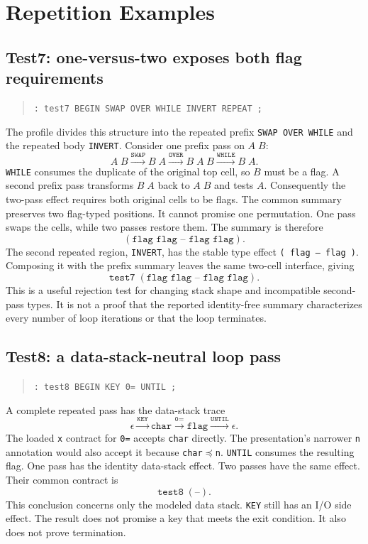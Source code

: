 \documentclass[11pt,a4paper]{article}
\newcommand{\effect}[1]{\mbox{\texttt{#1}}}
\begin{document}
\section{Repetition Examples}
\label{sec:loop-examples}

\subsection{Test7: one-versus-two exposes both flag requirements}

\begin{quote}
\texttt{: test7  BEGIN SWAP OVER WHILE INVERT REPEAT ;}
\end{quote}
The profile divides this structure into the repeated prefix
\texttt{SWAP OVER WHILE} and the repeated body \texttt{INVERT}.  Consider one
prefix pass on $A\;B$:
\[
 A\;B
 \xrightarrow{\texttt{SWAP}} B\;A
 \xrightarrow{\texttt{OVER}} B\;A\;B
 \xrightarrow{\texttt{WHILE}} B\;A.
\]
\texttt{WHILE} consumes the duplicate of the original top cell, so $B$ must be
a flag.  A second prefix pass transforms $B\;A$ back to $A\;B$ and tests $A$.
Consequently the two-pass effect requires both original cells to be flags.
The common summary preserves two flag-typed positions.  It cannot promise one
permutation.  One pass swaps the cells, while two passes restore them.  The
summary is therefore
\[
                        (\texttt{flag flag -- flag flag}).
\]
The second repeated region, \texttt{INVERT}, has the stable type effect
\effect{( flag -- flag )}.  Composing it with the prefix summary leaves the
same two-cell interface, giving
\[
          \texttt{test7}\;(\texttt{flag flag -- flag flag}).
\]
This is a useful rejection test for changing stack shape and incompatible
second-pass types.  It is not a proof that the reported identity-free summary
characterizes every number of loop iterations or that the loop terminates.

\subsection{Test8: a data-stack-neutral loop pass}

\begin{quote}
\texttt{: test8  BEGIN KEY 0= UNTIL ;}
\end{quote}
A complete repeated pass has the data-stack trace
\[
 \epsilon
 \xrightarrow{\texttt{KEY}} \texttt{char}
 \xrightarrow{\texttt{0=}} \texttt{flag}
 \xrightarrow{\texttt{UNTIL}} \epsilon.
\]
The loaded \texttt{x} contract for \texttt{0=} accepts \texttt{char}
directly.  The presentation's narrower \texttt{n} annotation would also accept
it because \texttt{char}$\preceq$\texttt{n}.  \texttt{UNTIL} consumes the
resulting flag.  One pass has the
identity data-stack effect.  Two passes have the same effect.  Their common
contract is
\[
                         \texttt{test8}\;(\texttt{--}).
\]
This conclusion concerns only the modeled data stack.  \texttt{KEY} still has
an I/O side effect.  The result does not promise a key that meets the exit
condition.  It also does not prove termination.
\end{document}
